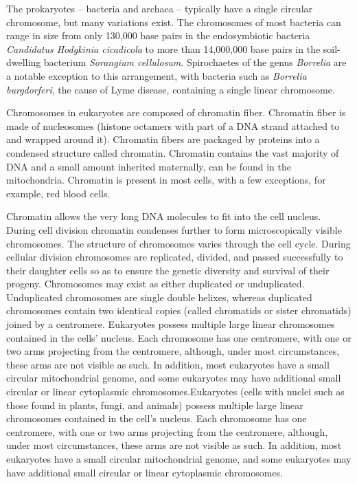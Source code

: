 \documentclass[]{book}
\begin{document}
The prokaryotes -- bacteria and archaea -- typically have a single
circular chromosome, but many variations exist. The chromosomes of most
bacteria can range in size from only 130,000 base pairs in the
endosymbiotic bacteria \emph{Candidatus Hodgkinia cicadicola} to more
than 14,000,000 base pairs in the soil-dwelling bacterium
\emph{Sorangium cellulosum}. Spirochaetes of the genus \emph{Borrelia}
are a notable exception to this arrangement, with bacteria such as
\emph{Borrelia burgdorferi}, the cause of Lyme disease, containing a
single linear chromosome.

Chromosomes in eukaryotes are composed of chromatin fiber. Chromatin
fiber is made of nucleosomes (histone octamers with part of a DNA strand
attached to and wrapped around it). Chromatin fibers are packaged by
proteins into a condensed structure called chromatin. Chromatin contains
the vast majority of DNA and a small amount inherited maternally, can be
found in the mitochondria. Chromatin is present in most cells, with a
few exceptions, for example, red blood cells.

Chromatin allows the very long DNA molecules to fit into the cell
nucleus. During cell division chromatin condenses further to form
microscopically visible chromosomes. The structure of chromosomes varies
through the cell cycle. During cellular division chromosomes are
replicated, divided, and passed successfully to their daughter cells so
as to ensure the genetic diversity and survival of their progeny.
Chromosomes may exist as either duplicated or unduplicated. Unduplicated
chromosomes are single double helixes, whereas duplicated chromosomes
contain two identical copies (called chromatids or sister chromatids)
joined by a centromere. Eukaryotes possess multiple large linear
chromosomes contained in the cells' nucleus. Each chromosome has one
centromere, with one or two arms projecting from the centromere,
although, under most circumstances, these arms are not visible as such.
In addition, most eukaryotes have a small circular mitochondrial genome,
and some eukaryotes may have additional small circular or linear
cytoplasmic chromosomes.Eukaryotes (cells with nuclei such as those
found in plants, fungi, and animals) possess multiple large linear
chromosomes contained in the cell's nucleus. Each chromosome has one
centromere, with one or two arms projecting from the centromere,
although, under most circumstances, these arms are not visible as such.
In addition, most eukaryotes have a small circular mitochondrial genome,
and some eukaryotes may have additional small circular or linear
cytoplasmic chromosomes.
\end{document}
